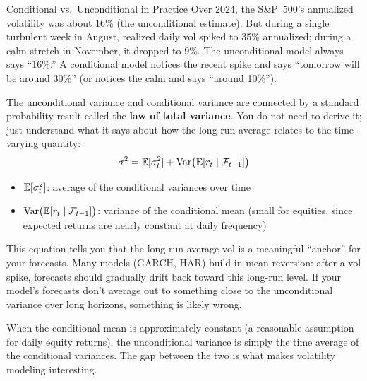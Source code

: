 \begin{workedexample}{Conditional vs.\ Unconditional in Practice}
Over 2024, the S\&P~500's annualized volatility was about 16\% (the unconditional estimate).
But during a single turbulent week in August, realized daily vol spiked to 35\% annualized; during a calm stretch in November, it dropped to 9\%.
The unconditional model always says ``16\%.'' A conditional model notices the recent spike and says ``tomorrow will be around 30\%'' (or notices the calm and says ``around 10\%'').
\end{workedexample}

The unconditional variance and conditional variance are connected by a standard probability result called the \textbf{law of total variance}.
You do not need to derive it; just understand what it says about how the long-run average relates to the time-varying quantity:
\begin{equation}
  \sigma^2 = \mathbb{E}[\sigma_t^2] + \operatorname{Var}\bigl(\mathbb{E}[r_t \mid \mathcal{F}_{t-1}]\bigr)
  \label{eq:total-variance}
\end{equation}
\begin{itemize}[nosep]
  \item $\mathbb{E}[\sigma_t^2]$: average of the conditional variances over time
  \item $\operatorname{Var}\bigl(\mathbb{E}[r_t \mid \mathcal{F}_{t-1}]\bigr)$: variance of the conditional mean (small for equities, since expected returns are nearly constant at daily frequency)
\end{itemize}

\begin{projectconnection}
This equation tells you that the long-run average vol is a meaningful ``anchor'' for your forecasts.
Many models (GARCH, HAR) build in mean-reversion: after a vol spike, forecasts should gradually drift back toward this long-run level.
If your model's forecasts don't average out to something close to the unconditional variance over long horizons, something is likely wrong.
\end{projectconnection}

When the conditional mean is approximately constant (a reasonable assumption for daily equity returns), the unconditional variance is simply the time average of the conditional variances.
The gap between the two is what makes volatility modeling interesting.

